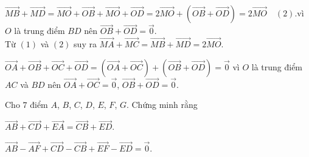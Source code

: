 \begin{bt}
{\begin{listEX}[1]
			$\overrightarrow{MB}+\overrightarrow{MD}=\overrightarrow{MO}+\overrightarrow{OB}+\overrightarrow{MO}+\overrightarrow{OD}=2\overrightarrow{MO}+\left(\overrightarrow{OB}+\overrightarrow{OD}\right) =2\overrightarrow{MO}\quad (2)$.vì $O$ là trung  điểm $BD$ nên $\overrightarrow{OB}+\overrightarrow{OD}=\overrightarrow{0}$.\\
			Từ $(1)$ và $(2)$ suy ra $\overrightarrow{MA}+\overrightarrow{MC}=\overrightarrow{MB}+\overrightarrow{MD}=2\overrightarrow{MO}$.
			\item $\overrightarrow{OA}+\overrightarrow{OB}+\overrightarrow{OC}+\overrightarrow{OD}=\left(\overrightarrow{OA}+\overrightarrow{OC}\right) +\left(\overrightarrow{OB}+\overrightarrow{OD}\right)=\overrightarrow{0}$ vì $O$ là trung  điểm $AC$ và $BD$ nên $\overrightarrow{OA}+\overrightarrow{OC}=\overrightarrow{0}$, $\overrightarrow{OB}+\overrightarrow{OD}=\overrightarrow{0}$.
		\end{listEX}
	}
\end{bt} 

\begin{bt}%
	Cho $7$ điểm $A$, $B$, $C$, $D$, $E$, $F$, $G$. Chứng minh rằng
	\begin{listEX}[2]
		\item $\overrightarrow{AB}+\overrightarrow{CD}+\overrightarrow{EA}=\overrightarrow{CB}+\overrightarrow{ED}$.
			\item $\overrightarrow{AB}-\overrightarrow{AF}+\overrightarrow{CD}-\overrightarrow{CB}+\overrightarrow{EF}-\overrightarrow{ED}=\overrightarrow{0}$.
	\end{listEX}
\end{bt} 

